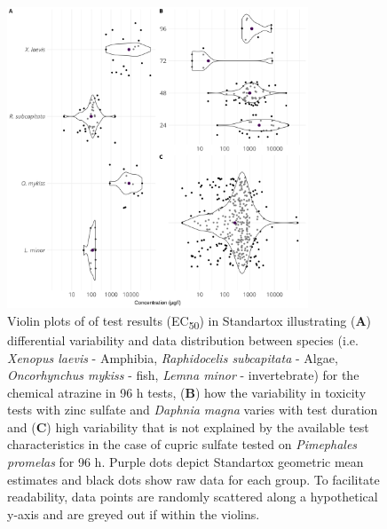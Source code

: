 \documentclass[journal,datadescriptor,accept,moreauthors,pdftex]{Definitions/mdpi}
\begin{document}
\begin{figure}[H]
    \centering
    \includegraphics[width=0.8\textwidth]{article/figures/results_variability.png}
    \caption{Violin plots of of test results (EC\textsubscript{50}) in Standartox illustrating (\textbf{A}) differential variability and data distribution between species (i.e. \textit{Xenopus laevis} - Amphibia, \textit{Raphidocelis subcapitata} - Algae, \textit{Oncorhynchus mykiss} - fish, \textit{Lemna minor} - invertebrate) for the chemical atrazine in 96 h tests, (\textbf{B}) how the variability in toxicity tests with zinc sulfate and \textit{Daphnia magna} varies with test duration and (\textbf{C}) high variability that is not explained by the available test characteristics in the case of cupric sulfate tested on \textit{Pimephales promelas} for 96 h. Purple dots depict Standartox geometric mean estimates and black dots show raw data for each group. To facilitate readability, data points are randomly scattered along a hypothetical y-axis and are greyed out if within the violins.}
    \label{fig:stx-variability}
\end{figure}
\end{document}
